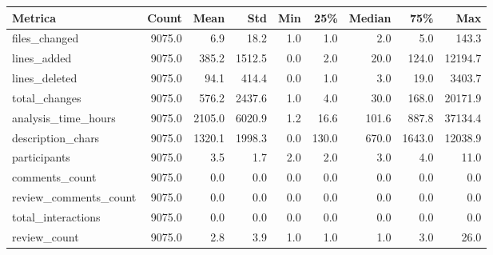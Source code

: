 \begin{tabular}{lrrrrrrrr}
\toprule
Metrica & Count & Mean & Std & Min & 25\% & Median & 75\% & Max \\
\midrule
files\_changed & 9075.0 & 6.9 & 18.2 & 1.0 & 1.0 & 2.0 & 5.0 & 143.3 \\
lines\_added & 9075.0 & 385.2 & 1512.5 & 0.0 & 2.0 & 20.0 & 124.0 & 12194.7 \\
lines\_deleted & 9075.0 & 94.1 & 414.4 & 0.0 & 1.0 & 3.0 & 19.0 & 3403.7 \\
total\_changes & 9075.0 & 576.2 & 2437.6 & 1.0 & 4.0 & 30.0 & 168.0 & 20171.9 \\
analysis\_time\_hours & 9075.0 & 2105.0 & 6020.9 & 1.2 & 16.6 & 101.6 & 887.8 & 37134.4 \\
description\_chars & 9075.0 & 1320.1 & 1998.3 & 0.0 & 130.0 & 670.0 & 1643.0 & 12038.9 \\
participants & 9075.0 & 3.5 & 1.7 & 2.0 & 2.0 & 3.0 & 4.0 & 11.0 \\
comments\_count & 9075.0 & 0.0 & 0.0 & 0.0 & 0.0 & 0.0 & 0.0 & 0.0 \\
review\_comments\_count & 9075.0 & 0.0 & 0.0 & 0.0 & 0.0 & 0.0 & 0.0 & 0.0 \\
total\_interactions & 9075.0 & 0.0 & 0.0 & 0.0 & 0.0 & 0.0 & 0.0 & 0.0 \\
review\_count & 9075.0 & 2.8 & 3.9 & 1.0 & 1.0 & 1.0 & 3.0 & 26.0 \\
\bottomrule
\end{tabular}
